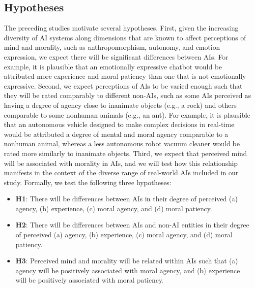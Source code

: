 \subsection{Hypotheses}

The preceding studies motivate several hypotheses. First, given the increasing diversity of AI systems along dimensions that are known to affect perceptions of mind and morality, such as anthropomorphism, autonomy, and emotion expression, we expect there will be significant differences between AIs. For example, it is plausible that an emotionally expressive chatbot would be attributed more experience and moral patiency than one that is not emotionally expressive. Second, we expect perceptions of AIs to be varied enough such that they will be rated comparably to different non-AIs, such as some AIs perceived as having a degree of agency close to inanimate objects (e.g., a rock) and others comparable to some nonhuman animals (e.g., an ant). For example, it is plausible that an autonomous vehicle designed to make complex decisions in real-time would be attributed a degree of mental and moral agency comparable to a nonhuman animal, whereas a less autonomous robot vacuum cleaner would be rated more similarly to inanimate objects. Third, we expect that perceived mind will be associated with morality in AIs, and we will test how this relationship manifests in the context of the diverse range of real-world AIs included in our study. Formally, we test the following three hypotheses:

\begin{itemize}
    \item \textbf{H1}: There will be differences between AIs in their degree of perceived (a) agency, (b) experience, (c) moral agency, and (d) moral patiency.
    \item \textbf{H2}: There will be differences between AIs and non-AI entities in their degree of perceived (a) agency, (b) experience, (c) moral agency, and (d) moral patiency.
    \item \textbf{H3}: Perceived mind and morality will be related within AIs such that (a) agency will be positively associated with moral agency, and (b) experience will be positively associated with moral patiency.
\end{itemize}